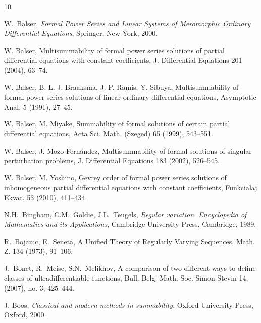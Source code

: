 \documentclass[11pt,a4paper]{article}
\theoremstyle{definition}
\begin{document}
\begin{thebibliography}{10}



 W.~Balser, \emph{Formal Power Series and Linear Systems of Meromorphic Ordinary Differential Equations},
Springer, New York, 2000.

 W. Balser, Multisummability of formal power series solutions of
partial differential equations with constant coefficients, J. Differential Equations 201 (2004),    63--74.

 W. Balser, B. L. J. Braaksma, J.-P. Ramis, Y. Sibuya, Multisummability of formal power
series solutions of linear ordinary differential equations, Asymptotic Anal. 5 (1991), 27--45.

 W. Balser, M. Miyake, Summability of formal solutions of certain partial differential
equations, Acta Sci. Math. (Szeged)  65 (1999), 543--551.

 W. Balser, J. Mozo-Fern\'andez, Multisummability of formal solutions of singular perturbation
problems, J. Differential Equations 183 (2002), 526--545.

 W. Balser, M. Yoshino, Gevrey order of formal power series solutions of inhomogeneous
partial differential equations with constant coefficients, Funkcialaj Ekvac. 53 (2010), 411--434.

 N.H.~Bingham, C.M.~Goldie, J.L.~Teugels, \emph{Regular variation. Encyclopedia of Mathematics and
its Applications}, Cambridge University Press, Cambridge, 1989.

 R.~Bojanic, E.~Seneta, A Unified Theory of Regularly Varying Sequences, Math. Z. 134 (1973), 91--106.

 J.~Bonet, R.~Meise, S.N.~Melikhov,  A comparison of two different ways to define
classes of ultradifferentiable functions, Bull. Belg. Math. Soc. Simon Stevin 14, (2007), no. 3, 425--444.

 J. Boos, \emph{Classical and modern methods in summability}, Oxford University Press, Oxford, 2000.


\end{thebibliography}
\end{document}
